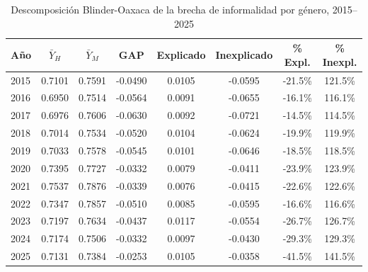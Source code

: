 \begin{table}[htbp]
\centering
\caption{Descomposición Blinder-Oaxaca de la brecha de informalidad por género, 2015–2025}
\label{tab:oaxaca}
\begin{tabular}{lccccccc}
\hline\hline
Año & $\bar{Y}_H$ & $\bar{Y}_M$ & GAP & Explicado & Inexplicado & \% Expl. & \% Inexpl. \\
\hline
2015 & 0.7101 & 0.7591 & -0.0490 & 0.0105 & -0.0595 & -21.5\% & 121.5\% \\
2016 & 0.6950 & 0.7514 & -0.0564 & 0.0091 & -0.0655 & -16.1\% & 116.1\% \\
2017 & 0.6976 & 0.7606 & -0.0630 & 0.0092 & -0.0721 & -14.5\% & 114.5\% \\
2018 & 0.7014 & 0.7534 & -0.0520 & 0.0104 & -0.0624 & -19.9\% & 119.9\% \\
2019 & 0.7033 & 0.7578 & -0.0545 & 0.0101 & -0.0646 & -18.5\% & 118.5\% \\
2020 & 0.7395 & 0.7727 & -0.0332 & 0.0079 & -0.0411 & -23.9\% & 123.9\% \\
2021 & 0.7537 & 0.7876 & -0.0339 & 0.0076 & -0.0415 & -22.6\% & 122.6\% \\
2022 & 0.7347 & 0.7857 & -0.0510 & 0.0085 & -0.0595 & -16.6\% & 116.6\% \\
2023 & 0.7197 & 0.7634 & -0.0437 & 0.0117 & -0.0554 & -26.7\% & 126.7\% \\
2024 & 0.7174 & 0.7506 & -0.0332 & 0.0097 & -0.0430 & -29.3\% & 129.3\% \\
2025 & 0.7131 & 0.7384 & -0.0253 & 0.0105 & -0.0358 & -41.5\% & 141.5\% \\
\hline\hline
\end{tabular}
\end{table}